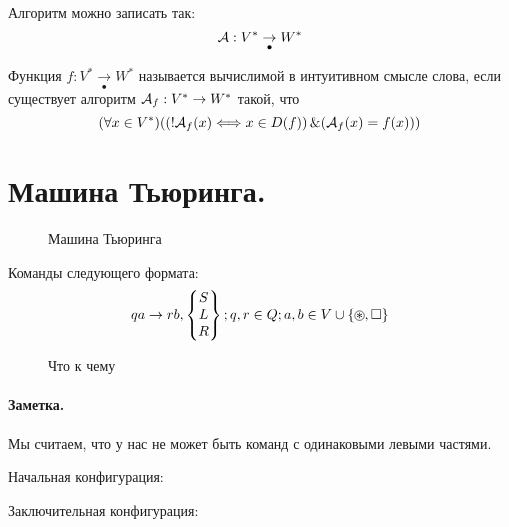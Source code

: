 \begin{definition}
Алгоритм можно записать так: \[
	{\cal A}: V^{*} \underset{\bullet}{\to } W^{*}
\] 
\end{definition}

\begin{definition}
Функция $f: V^{*} \underset{\bullet}{\to } W^{*}$ называется вычислимой в интуитивном смысле слова,
если существует алгоритм $ {\cal A}_f: V^{*} \to  W^{*}$ такой, что
$$(\forall x \in V^{*})
((! {\cal A}_f(x) \Longleftrightarrow x \in D(f))\operatorname{\&} ( {\cal A}_f (x) = f(x)))$$
\end{definition}

\section{Машина Тьюринга.}

\begin{figure}[h]
    \centering
    \caption{Машина Тьюринга}
    \label{turing1}
\end{figure}


Команды следующего формата: \[
qa \to rb,
\begin{Bmatrix}
	S \\ L \\ R
\end{Bmatrix}; q,r \in Q; a,b \in V \cup \{\ozv, \square  \} 
\] 

\begin{figure}[h]
    \centering
    \caption{Что к чему}
    \label{}
\end{figure}

\paragraph*{Заметка.}
Мы считаем, что у нас не может быть команд с одинаковыми левыми частями.

\medskip

\newpage

Начальная конфигурация:

\begin{figure}[h]
    \centering
\end{figure}

Заключительная конфигурация:

\begin{figure}[h]
    \centering
\end{figure}

